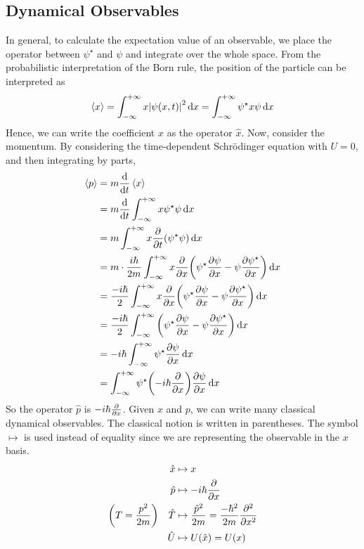 \subsection{Dynamical Observables}
In general, to calculate the expectation value of an observable, we place the operator between \( \psi^\star \) and \( \psi \) and integrate over the whole space.
From the probabilistic interpretation of the Born rule, the position of the particle can be interpreted as
\[ \left\langle{x}\right\rangle = \int_{-\infty}^{+\infty} x \abs{\psi(x,t)}^2 \dd{x} = \int_{-\infty}^{+\infty} \psi^\star x \psi \dd{x} \]
Hence, we can write the coefficient \( x \) as the operator \( \hat x \).
Now, consider the momentum.
By considering the time-dependent Schr\"odinger equation with \( U = 0 \), and then integrating by parts,
\begin{align*}
	\left\langle{p}\right\rangle &= m \dv{t} \left\langle{x}\right\rangle \\
	&= m \dv{t} \int_{-\infty}^{+\infty} x \psi^\star \psi \dd{x} \\
	&= m \int_{-\infty}^{+\infty} x \pdv{t} \qty( \psi^\star \psi ) \dd{x} \\
	&= m \cdot \frac{i \hbar}{2m} \int_{-\infty}^{+\infty} x \pdv{x}\qty( \psi^\star \pdv{\psi}{x} - \psi \pdv{\psi^\star}{x} ) \dd{x} \\
	&= \frac{-i \hbar}{2} \int_{-\infty}^{+\infty} x \pdv{x}\qty( \psi^\star \pdv{\psi}{x} - \psi \pdv{\psi^\star}{x} ) \dd{x} \\
	&= \frac{-i \hbar}{2} \int_{-\infty}^{+\infty} \qty( \psi^\star \pdv{\psi}{x} - \psi \pdv{\psi^\star}{x} ) \dd{x} \\
	&= -i \hbar \int_{-\infty}^{+\infty} \psi^\star \pdv{\psi}{x} \dd{x} \\
	&= \int_{-\infty}^{+\infty} \psi^\star \qty(-i \hbar \pdv{x} ) \pdv{\psi}{x} \dd{x}
\end{align*}
So the operator \( \hat p \) is \( -i \hbar \pdv{x} \).
Given \( x \) and \( p \), we can write many classical dynamical observables.
The classical notion is written in parentheses.
The symbol \( \mapsto \) is used instead of equality since we are representing the observable in the \( x \) basis.
\begin{align*}
	\hat x &\mapsto x \\
	\hat p &\mapsto -i\hbar \pdv{x} \\
	\qty(T = \frac{p^2}{2m})\quad \hat T &\mapsto \frac{\hat p^2}{2m} = \frac{-\hbar^2}{2m} \pdv[2]{x} \\
	\hat U &\mapsto U(\hat x) = U(x)
\end{align*}

